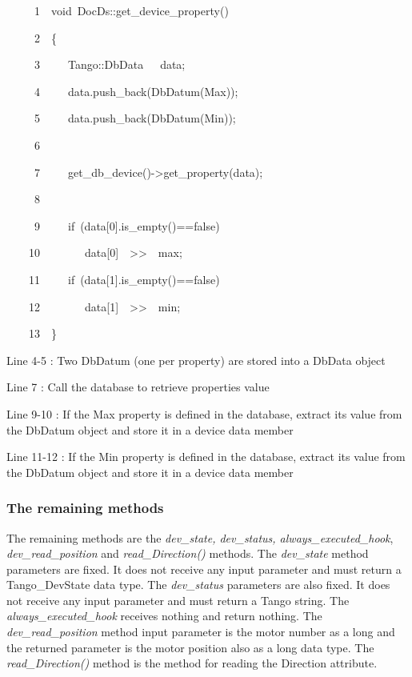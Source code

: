 
\begin{lyxcode}
~~~~~1~~void~DocDs::get\_device\_property()

~~~~~2~~\{

~~~~~3~~~~~Tango::DbData~~~data;

~~~~~4~~~~~data.push\_back(DbDatum(\textquotedbl{}Max\textquotedbl{}));

~~~~~5~~~~~data.push\_back(DbDatum(\textquotedbl{}Min\textquotedbl{}));

~~~~~6~~

~~~~~7~~~~~get\_db\_device()->get\_property(data);

~~~~~8~~

~~~~~9~~~~~if~(data{[}0{]}.is\_empty()==false)

~~~~10~~~~~~~~data{[}0{]}~~>\textcompwordmark{}>~~max;

~~~~11~~~~~if~(data{[}1{]}.is\_empty()==false)

~~~~12~~~~~~~~data{[}1{]}~~>\textcompwordmark{}>~~min;

~~~~13~~\}
\end{lyxcode}


Line 4-5 : Two DbDatum (one per property) are stored into a DbData
object

Line 7 : Call the database to retrieve properties value

Line 9-10 : If the Max property is defined in the database, extract
its value from the DbDatum object and store it in a device data member

Line 11-12 : If the Min property is defined in the database, extract
its value from the DbDatum object and store it in a device data member

\subsubsection{The remaining methods}

The remaining methods are the \emph{dev\_state, dev\_status, always\_executed\_hook},
\emph{dev\_read\_position} and \emph{read\_Direction()} methods. The
\emph{dev\_state} method parameters are fixed. It
does not receive any input parameter and must return a Tango\_DevState
data type. The \emph{dev\_status} parameters are
also fixed. It does not receive any input parameter and must return
a Tango string. The \emph{always\_executed\_hook}
receives nothing and return nothing. The \emph{dev\_read\_position}
method input parameter is the motor number as a long and the returned
parameter is the motor position also as a long data type. The \emph{read\_Direction()}
method is the method for reading the Direction attribute.

